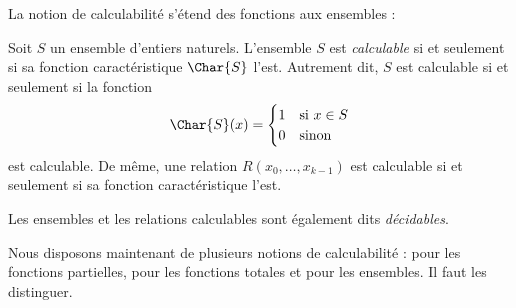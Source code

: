 \documentclass[../../../include/open-logic-section]{subfiles}
\begin{document}

La notion de calculabilité s'étend des
fonctions aux ensembles :

\begin{defn}
  Soit $S$ un ensemble d'entiers naturels.
  L'ensemble $S$ est \emph{calculable} si et
  seulement si sa fonction caractéristique
  $\Char{S}$ l'est. Autrement dit, $S$ est
  calculable si et seulement si la fonction
\[
\Char{S}(x) =
\begin{cases}
1 & \text{si $x\in S$}\\
0 & \text{sinon}
\end{cases}
\]
  est calculable. De même, une relation
  $R(x_0,\dots,x_{k-1})$ est calculable si
  et seulement si sa fonction caractéristique
  l'est.

Les ensembles et les relations calculables
sont également dits \emph{décidables}.
\end{defn}

\begin{explain}
Nous disposons maintenant de plusieurs notions
de calculabilité : pour les fonctions partielles,
pour les fonctions totales et pour les ensembles.
Il faut les distinguer.
\end{explain}
\end{document}

